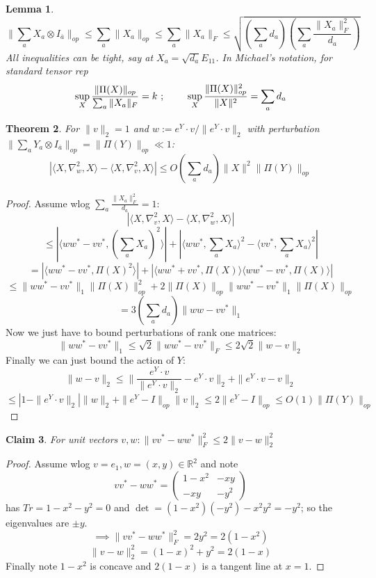 \documentclass{article}
\newtheorem{theorem}{Theorem}
\newtheorem{lemma}[theorem]{Lemma}
\newtheorem{claim}[theorem]{Claim}
\newcommand{\R}{{\mathbb{R}}}
\begin{document}
\begin{lemma}
\[ \|\sum_{a} X_{a} \otimes I_{\overline{a}}\|_{op} \leq \sum_{a} \|X_{a}\|_{op} \leq \sum_{a} \|X_{a}\|_{F} \leq \sqrt{ \left( \sum_{a} d_{a} \right) \left( \sum_{a} \frac{\|X_{a}\|_{F}^{2}}{d_{a}}  \right)} \]
All inequalities can be tight, say at $X_{a} = \sqrt{d_{a}} E_{11}$. In Michael's notation, for standard tensor rep
\[ \sup_{X} \frac{\|\Pi(X)\|_{op}}{\sum_{a} \|X_{a}\|_{F}} = k  \text{  ;  } \hspace{7mm}
\sup_{X} \frac{\|\Pi(X)\|_{op}^{2}}{\|X\|^{2}} = \sum_{a} d_{a}  \]
\end{lemma}

\begin{theorem}
For $\|v\|_{2} = 1$ and $w := e^{Y} \cdot v / \|e^{Y} \cdot v\|_{2}$ with perturbation $\|\sum_{a} Y_{a} \otimes I_{\overline{a}}\|_{op} = \|\Pi(Y)\|_{op} \ll 1$:
\[ |\langle X, \nabla_{w}^{2}, X \rangle - \langle X, \nabla_{v}^{2}, X \rangle| \leq O(\sum_{a} d_{a}) \|X\|^{2} \|\Pi(Y)\|_{op}   \]
\end{theorem}
\begin{proof}
Assume wlog $\sum_{a} \frac{\|X_{a}\|_{F}^{2}}{d_{a}} = 1$:
\[ |\langle X, \nabla_{v}^{2}, X \rangle - \langle X, \nabla_{w}^{2}, X \rangle| \]
\[ \leq |\langle w w^{*} - v v^{*}, \left( \sum_{a} X_{a} \right)^{2} \rangle| + |\langle w w^{*}, \sum_{a} X_{a} \rangle^{2} - \langle v v^{*}, \sum_{a} X_{a} \rangle^{2}| \]
\[ = |\langle w w^{*} - v v^{*}, \Pi(X)^{2} \rangle| + |\langle w w^{*} + v v^{*}, \Pi(X) \rangle \langle w w^{*} - v v^{*}, \Pi(X) \rangle|    \]
\[ \leq \|w w^{*} - v v^{*}\|_{1} \|\Pi(X)\|_{op}^{2} + 2 \|\Pi(X)\|_{op} \|w w^{*} - v v^{*}\|_{1} \|\Pi(X)\|_{op}  \]
\[ = 3 (\sum_{a} d_{a}) \|w w - v v^{*}\|_{1}   \]
Now we just have to bound perturbations of rank one matrices:
\[ \|w w^{*} - v v^{*}\|_{1} \leq \sqrt{2} \|w w^{*} - v v^{*}\|_{F} \leq 2 \sqrt{2} \|w - v\|_{2}  \]
Finally we can just bound the action of $Y$:
\[ \|w - v\|_{2} \leq \|\frac{e^{Y} \cdot v}{\|e^{Y} \cdot v\|_{2}} - e^Y \cdot v\|_{2} + \|e^{Y} \cdot v - v\|_{2}  \]
\[ \leq |1 - \|e^{Y} \cdot v\|_{2}| \|w\|_{2} + \|e^{Y} - I\|_{op} \|v\|_{2} \leq 2 \|e^{Y} - I\|_{op} \leq O(1) \|\Pi(Y)\|_{op} \]
\end{proof}

\begin{claim}
For unit vectors $v,w: \|v v^{*} - w w^{*}\|_{F}^{2} \leq 2 \|v - w\|_{2}^{2}$
\end{claim}
\begin{proof}
Assume wlog $v = e_{1}, w = (x,y) \in \R^{2}$ and note
\[ v v^{*} - w w^{*} = \begin{pmatrix} 1 - x^{2} & -xy \\ -xy & -y^{2} \end{pmatrix}  \]
has $Tr = 1 - x^{2} - y^{2} = 0$ and $\det = (1-x^{2})(-y^{2}) - x^{2} y^{2} = - y^{2}$; so the eigenvalues are $\pm y$.
\[ \implies \|v v^{*} - w w^{*}\|_{F}^{2} = 2 y^{2} = 2(1-x^{2}) \]
\[ \|v - w\|_{2}^{2} = (1-x)^{2} + y^{2} = 2(1-x) \]
Finally note $1 - x^{2}$ is concave and $2(1-x)$ is a tangent line at $x=1$.
\end{proof}
\end{document}
